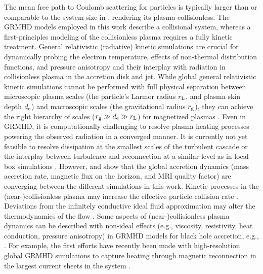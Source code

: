 {The mean free path to Coulomb scattering for particles is typically larger than or comparable to the system size in \sgra, rendering its plasma collisionless. The GRMHD models employed in this work describe a collisional system, whereas a first-principles modeling of the collisionless plasma requires a fully kinetic treatment. General relativistic (radiative) kinetic simulations are crucial for dynamically probing the electron temperature, effects of non-thermal distribution functions, and pressure anisotropy and their interplay with radiation in collisionless plasma in the accretion disk and jet. While global general relativistic kinetic simulations cannot be performed with full physical separation between microscopic plasma scales (the particle's Larmor radius $r_{\rm L}$, and plasma skin depth $d_{\rm e}$) and macroscopic scales (the gravitational radius $r_{\rm g}$), they can achieve the right hierarchy of scales ($r_{\rm g} \gg d_{\rm e} \gg r_{\rm L}$) for magnetized plasmas \citep{2018A&A...616A.184L,2018ApJ...863L..31C,2019PhRvL.122c5101P,2020PhRvL.124n5101C,2020ApJ...895..121C,2020ApJ...902...80K,2021A&A...650A.163C,2021PhRvL.127e5101B}. Even in GRMHD, it is computationally challenging to resolve plasma heating processes powering the observed radiation in a converged manner. It is currently not yet feasible to resolve dissipation at the smallest scales of the turbulent cascade or the interplay between turbulence and reconnection at a similar level as in local box simulations \citep{2012ApJ...755...50R,2013ApJ...773..118H,2015PhRvL.114f1101H,2016PhRvL.117w5101K,2017PhRvL.118e5103Z,2018PhRvL.121y5101C,2018ApJ...859..149I,2019PhRvL.122e5101Z,2021ApJ...921...87N,2021arXiv211108188C}. However, \citet{2019ApJS..243...26P} and \citet[in prep.]{Olivares_et_al} show that the global accretion dynamics (mass accretion rate, magnetic flux on the horizon, and MRI quality factor) are converging between the different simulations in this work. Kinetic processes in the (near-)collisionless plasma may increase the effective particle collision rate \citep[see, e.g.,][]{2016PhRvL.117w5101K}. Deviations from the infinitely conductive ideal fluid approximation may alter the thermodynamics of the flow \citep[see, e.g., ][and Appendix C1]{2017MNRAS.470.2240F}. Some aspects of (near-)collisionless plasma dynamics can be described with non-ideal effects (e.g., viscosity, resistivity, heat conduction, pressure anisotropy) in GRMHD models for black hole accretion, e.g.,  \cite{2014MNRAS.440L..41B,2015ApJ...810..162C,2016MNRAS.456.1332F,2017ApJ...837...92C,2017MNRAS.470.2240F,2018ApJ...859...28Q,2019ApJS..244...10R,2019ApJ...882....2V,2020ApJ...900..100R,2021PhRvD.104j3028M,2021arXiv211103689N,2021arXiv211105752M}. For example, the first efforts have recently been made with high-resolution global GRMHD simulations to capture heating through magnetic reconnection in the largest current sheets in the system \citep{2020MNRAS.495.1549N,2020ApJ...900..100R,2021MNRAS.508.1241C,2021arXiv210915115R,2021arXiv211103689N}.}

